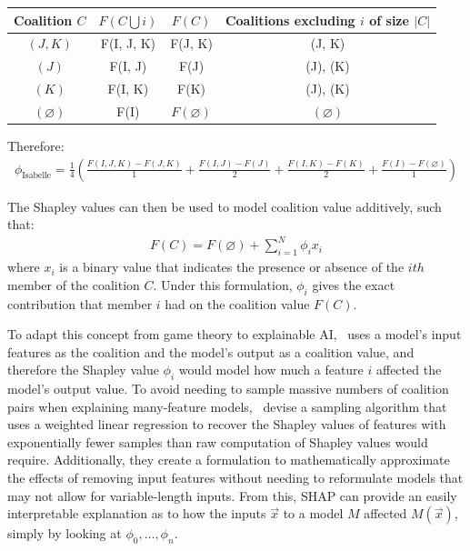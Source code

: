 \begin{center}
\begin{tabular}{c|ccc}
         Coalition $C$  & $F(C\bigcup i)$   &  $F(C)$           & Coalitions excluding $i$ of size $|C|$ \\ \hline
         $(J,K)$          & F(I, J, K)        & F(J, K)           & (J, K) \\
         $(J)$            & F(I, J)           & F(J)              & (J), (K) \\
         $(K)$            & F(I, K)           & F(K)              & (J), (K) \\
         $(\varnothing)$  & F(I)              & $F(\varnothing)$  & $(\varnothing)$ \\
\end{tabular}
\end{center}
\noindent Therefore:
\begin{align*}
    \phi_{\text{Isabelle}} = \frac{1}{4} \left(\frac{F(I, J, K) - F(J, K)}{1} + \frac{F(I, J) - F(J)}{2} + \frac{F(I, K) - F(K)}{2} + \frac{F(I) - F(\varnothing)}{1} \right)
\end{align*}

The Shapley values can then be used to model coalition value additively, such that:
\begin{align}
    F(C) = F(\varnothing) + \sum_{i=1}^N \phi_i x_i
\end{align}
\noindent where $x_i$ is a binary value that indicates the presence or absence of the $ith$ member of the coalition $C$.
Under this formulation, $\phi_i$ gives the exact contribution that member $i$ had on the coalition value $F(C)$.

To adapt this concept from game theory to explainable AI,~\cite{lundberg2017} uses a model's input features
as the coalition and the model's output as a coalition value, and therefore the Shapley value $\phi_i$ would
model how much a feature $i$ affected the model's output value. To avoid needing to sample massive numbers of
coalition pairs when explaining many-feature models,~\citeauthor{lundberg2017} devise a sampling algorithm that uses a weighted linear
regression to recover the Shapley values of features with exponentially fewer samples than raw computation of Shapley
values would require. Additionally, they create a formulation to mathematically approximate the effects of removing input features
without needing to reformulate models that may not allow for variable-length inputs. From this, SHAP can
provide an easily interpretable explanation as to how the inputs $\vec{x}$ to a model $M$ affected $M(\vec{x})$, simply by looking at
$\phi_0, \dots, \phi_n$.


